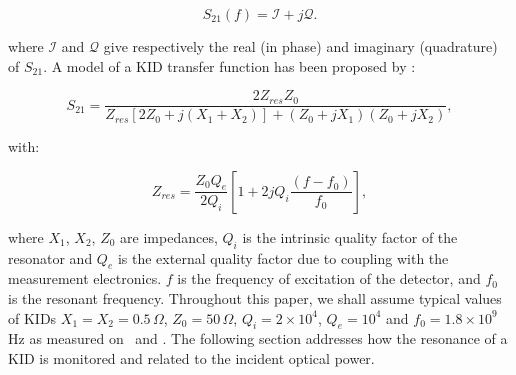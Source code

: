 \begin{equation}
S_{21}(f) = \mathcal{I} +j\mathcal{Q} .
\end{equation}

\noindent where $\mathcal{I}$ and $\mathcal{Q}$ give respectively the real (in phase) and imaginary
(quadrature) of $S_{21}$. A model of a KID transfer function has been proposed
by \citet{2008ApPhL..93m4102G} :

\begin{equation}
S_{21} = \frac{2Z_{res}Z_{0}}{Z_{res}[2Z_{0} + j(X_{1}+X_{2})] + (Z_{0} +jX_{1})(Z_{0} +jX_{2})},
\end{equation}

with:

\begin{equation}
Z_{res} = \frac{Z_{0}Q_{e}}{2Q_{i}}[1 + 2jQ_{i}\frac{(f-f_{0})}{f_{0}}],
\end{equation}

\noindent where $X_{1}$, $X_{2}$, $Z_{0}$ are impedances, $Q_{i}$ is the
intrinsic quality factor of the resonator and $Q_{e}$ is the external quality
factor due to coupling with the measurement electronics. $f$ is the frequency of
excitation of the detector, and $f_{0}$ is the resonant frequency. Throughout
this paper, we shall assume typical values of KIDs $X_{1} = X_{2} =
0.5\,\Omega$, $Z_{0} = 50\,\Omega$, $Q_i=2\times 10^4$, $Q_e=10^4$ and $f_{0} =
1.8\times 10^9$\,Hz as measured on \nika\ and \nikad. The following section
addresses how the resonance of a KID is monitored and related to the incident
optical power.

